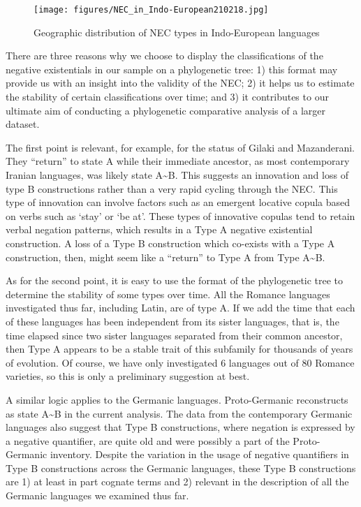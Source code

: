 \documentclass[output=paper,colorlinks,citecolor=brown]{langscibook}
\begin{document}
\begin{sidewaysfigure}
    \texttt{[image: figures/NEC\_in\_Indo-European210218.jpg]}
    \caption{Geographic distribution of NEC types in Indo-European languages}
    \label{fig:ieur-map}
\end{sidewaysfigure}
There are three reasons why we choose to display the classifications of the negative existentials in our sample on a phylogenetic tree: 1) this format may provide us with an insight into the validity of the NEC; 2) it helps us to estimate the stability of certain classifications over time; and 3) it contributes to our ultimate aim of conducting a phylogenetic comparative analysis of a larger dataset. 

The first point is relevant, for example, for the status of Gilaki and
Mazanderani. They ``return'' to state A while their immediate ancestor, as most contemporary Iranian languages, was likely state A{\textasciitilde}B. This suggests an innovation and loss of type B constructions rather than a very rapid cycling through the NEC. This type of innovation can involve factors such as an emergent locative copula based on verbs such as `stay' or `be at'. These types of innovative copulas tend to retain verbal negation patterns, which results in a Type A negative existential construction. A loss of a Type B construction which co-exists with a Type A construction, then, might seem like a “return” to Type A from Type A{\textasciitilde}B. 

As for the second point, it is easy to use the format of the phylogenetic tree to determine the stability of some types over time. All the Romance languages investigated thus far, including Latin, are of type A.  If we add the time that each of these languages has been independent from its sister languages, that is, the time elapsed since two sister languages separated from their common ancestor, then Type A appears to be a stable trait of this subfamily for thousands of years of evolution. Of course, we have only investigated 6 languages out of 80 Romance varieties, so this is only a preliminary suggestion at best. 

\hspace*{-4pt} A similar logic applies to the Germanic languages. Proto-Germanic reconstructs as state A{\textasciitilde}B in the current analysis. The data from the contemporary Germanic languages also suggest that Type B constructions, where negation is expressed by a negative quantifier, are quite old and were possibly a part of the Proto-Germanic inventory. Despite the variation in the usage of negative quantifiers in Type B constructions across the Germanic languages, these Type B constructions are 1) at least in part cognate terms and 2) relevant in the description of all the Germanic languages we examined thus far.
\end{document}

